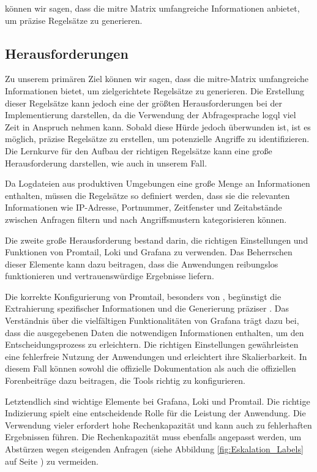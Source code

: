 können wir sagen, dass die \gls{mitre} Matrix umfangreiche Informationen anbietet, um präzise Regelsätze zu generieren. 

\subsection{Herausforderungen}
Zu unserem primären Ziel können wir sagen, dass die \gls{mitre}-Matrix umfangreiche Informationen bietet, um zielgerichtete Regelsätze zu generieren. Die Erstellung dieser Regelsätze kann jedoch eine der größten Herausforderungen bei der Implementierung darstellen, da die Verwendung der Abfragesprache \gls{logql} viel Zeit in Anspruch nehmen kann. Sobald diese Hürde jedoch überwunden ist, ist es möglich, präzise Regelsätze zu erstellen, um potenzielle Angriffe zu identifizieren. Die Lernkurve für den Aufbau der richtigen Regelsätze kann eine große Herausforderung darstellen, wie auch in unserem Fall.

Da Logdateien aus produktiven Umgebungen eine große Menge an Informationen enthalten, müssen die Regelsätze so definiert werden, dass sie die relevanten Informationen wie IP-Adresse, Portnummer, Zeitfenster und Zeitabstände zwischen Anfragen filtern und nach Angriffsmustern kategorisieren können.

Die zweite große Herausforderung bestand darin, die richtigen Einstellungen und Funktionen von Promtail, Loki und Grafana zu verwenden. Das Beherrschen dieser Elemente kann dazu beitragen, dass die Anwendungen reibungslos funktionieren und vertrauenswürdige Ergebnisse liefern.

Die korrekte Konfigurierung von Promtail, besonders von , begünstigt die Extrahierung spezifischer Informationen und die Generierung präziser . Das Verständnis über die vielfältigen Funktionalitäten von Grafana trägt dazu bei, dass die ausgegebenen Daten die notwendigen Informationen enthalten, um den Entscheidungsprozess zu erleichtern. Die richtigen Einstellungen gewährleisten eine fehlerfreie Nutzung der Anwendungen und erleichtert ihre Skalierbarkeit. In diesem Fall können sowohl die offizielle Dokumentation als auch die offiziellen Forenbeiträge dazu beitragen, die Tools richtig zu konfigurieren.

\newpage
Letztendlich sind  wichtige Elemente bei Grafana, Loki und Promtail. Die richtige Indizierung spielt eine entscheidende Rolle für die Leistung der Anwendung. Die Verwendung vieler  erfordert hohe Rechenkapazität und kann auch zu fehlerhaften Ergebnissen führen. Die Rechenkapazität muss ebenfalls angepasst werden, um Abstürzen wegen steigenden Anfragen (siehe Abbildung \ref{fig:Eskalation_Labels} auf Seite \pageref{fig:Eskalation_Labels}) zu vermeiden.

